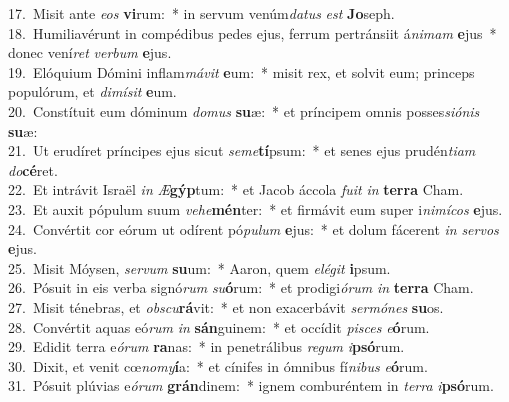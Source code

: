 {17.~}Misit ante \textit{e}\textit{os} \textbf{vi}rum:~* in servum venúm\textit{da}\textit{tus} \textit{est} \textbf{Jo}seph.\\
{18.~}Humiliavérunt in compédibus pedes ejus, ferrum pertránsiit á\textit{ni}\textit{mam} \textbf{e}jus~* donec vení\textit{ret} \textit{ver}\textit{bum} \textbf{e}jus.\\
{19.~}Elóquium Dómini inflam\textit{má}\textit{vit} \textbf{e}um:~* misit rex, et solvit eum; princeps populórum, et \textit{di}\textit{mí}\textit{sit} \textbf{e}um.\\
{20.~}Constítuit eum dóminum \textit{do}\textit{mus} \textbf{su}æ:~* et príncipem omnis posses\textit{si}\textit{ó}\textit{nis} \textbf{su}æ:\\
{21.~}Ut erudíret príncipes ejus sicut \textit{se}\textit{me}\textbf{tí}psum:~* et senes ejus prudén\textit{ti}\textit{am} \textit{do}\textbf{cé}ret.\\
{22.~}Et intrávit Israël \textit{in} \textit{Æ}\textbf{gýp}tum:~* et Jacob áccola \textit{fu}\textit{it} \textit{in} \textbf{ter}\textbf{ra} Cham.\\
{23.~}Et auxit pópulum suum \textit{ve}\textit{he}\textbf{mén}ter:~* et firmávit eum super i\textit{ni}\textit{mí}\textit{cos} \textbf{e}jus.\\
{24.~}Convértit cor eórum ut odírent pó\textit{pu}\textit{lum} \textbf{e}jus:~* et dolum fácerent \textit{in} \textit{ser}\textit{vos} \textbf{e}jus.\\
{25.~}Misit Móysen, \textit{ser}\textit{vum} \textbf{su}um:~* Aaron, quem \textit{e}\textit{lé}\textit{git} \textbf{i}psum.\\
{26.~}Pósuit in eis verba signó\textit{rum} \textit{su}\textbf{ó}rum:~* et prodigi\textit{ó}\textit{rum} \textit{in} \textbf{ter}\textbf{ra} Cham.\\
{27.~}Misit ténebras, et \textit{ob}\textit{scu}\textbf{rá}vit:~* et non exacerbávit \textit{ser}\textit{mó}\textit{nes} \textbf{su}os.\\
{28.~}Convértit aquas eó\textit{rum} \textit{in} \textbf{sán}guinem:~* et occídit \textit{pi}\textit{sces} \textit{e}\textbf{ó}rum.\\
{29.~}Edidit terra e\textit{ó}\textit{rum} \textbf{ra}nas:~* in penetrálibus \textit{re}\textit{gum} \textit{i}\textbf{psó}rum.\\
{30.~}Dixit, et venit cœ\textit{no}\textit{my}\textbf{í}a:~* et cínifes in ómnibus fí\textit{ni}\textit{bus} \textit{e}\textbf{ó}rum.\\
{31.~}Pósuit plúvias e\textit{ó}\textit{rum} \textbf{grán}dinem:~* ignem comburéntem in \textit{ter}\textit{ra} \textit{i}\textbf{psó}rum.\\
